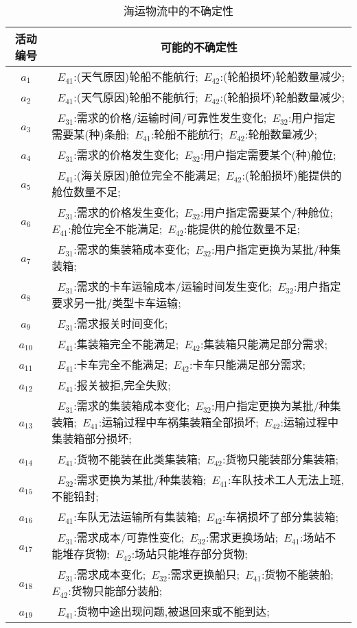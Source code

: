 \begin{table}[htbp]
    \caption{海运物流中的不确定性}
    \vspace{-0.5em}\label{table:ocean_shipping_uc}\centering{}
    \begin{tabularx}{\textwidth}{cX}
    \toprule
        活动编号  & \multicolumn{1}{c}{可能的不确定性} \\
    \midrule
    ~$a_1$~ & ~$E_{41}$:(天气原因)轮船不能航行;~$E_{42}$:(轮船损坏)轮船数量减少; \\
    ~$a_2$~ & ~$E_{41}$:(天气原因)轮船不能航行;~$E_{42}$:(轮船损坏)轮船数量减少; \\
    ~$a_3$~ & ~$E_{31}$:需求的价格/运输时间/可靠性发生变化;~$E_{32}$:用户指定需要某(种)条船;~$E_{41}$:轮船不能航行;~$E_{42}$:轮船数量减少; \\
    ~$a_4$~ & ~$E_{31}$:需求的价格发生变化;~$E_{32}$:用户指定需要某个(种)舱位; \\
    ~$a_5$~ & ~$E_{41}$:(海关原因)舱位完全不能满足;~$E_{42}$:(轮船损坏)能提供的舱位数量不足; \\
    ~$a_6$~ & ~$E_{31}$:需求的价格发生变化;~$E_{32}$:用户指定需要某个/种舱位;~$E_{41}$:舱位完全不能满足;~$E_{42}$:能提供的舱位数量不足; \\
    ~$a_7$~ & ~$E_{31}$:需求的集装箱成本变化;~$E_{32}$:用户指定更换为某批/种集装箱; \\
    ~$a_8$~ & ~$E_{31}$:需求的卡车运输成本/运输时间发生变化;~$E_{32}$:用户指定要求另一批/类型卡车运输; \\
    ~$a_9$~ & ~$E_{31}$:需求报关时间变化; \\
    ~$a_{10}$~ & ~$E_{41}$:集装箱完全不能满足;~$E_{42}$:集装箱只能满足部分需求; \\
    ~$a_{11}$~ & ~$E_{41}$:卡车完全不能满足;~$E_{42}$:卡车只能满足部分需求; \\
    ~$a_{12}$~ & ~$E_{41}$:报关被拒,完全失败; \\
    ~$a_{13}$~ & ~$E_{31}$:需求的集装箱成本变化;~$E_{32}$:用户指定更换为某批/种集装箱;~$E_{41}$:运输过程中车祸集装箱全部损坏;~$E_{42}$:运输过程中集装箱部分损坏; \\
    ~$a_{14}$~ & ~$E_{41}$:货物不能装在此类集装箱;~$E_{42}$:货物只能装部分集装箱; \\
    ~$a_{15}$~ & ~$E_{32}$:需求更换为某批/种集装箱;~$E_{41}$:车队技术工人无法上班,不能铅封; \\
    ~$a_{16}$~ & ~$E_{41}$:车队无法运输所有集装箱;~$E_{42}$:车祸损坏了部分集装箱; \\
    ~$a_{17}$~ & ~$E_{31}$:需求成本/可靠性变化;~$E_{32}$:需求更换场站;~$E_{41}$:场站不能堆存货物;~$E_{42}$:场站只能堆存部分货物; \\
    ~$a_{18}$~ & ~$E_{31}$:需求成本变化;~$E_{32}$:需求更换船只;~$E_{41}$:货物不能装船;~$E_{42}$:货物只能部分装船; \\
    ~$a_{19}$~ & ~$E_{41}$:货物中途出现问题,被退回来或不能到达; \\
    \bottomrule
    \end{tabularx}%
\end{table}%

